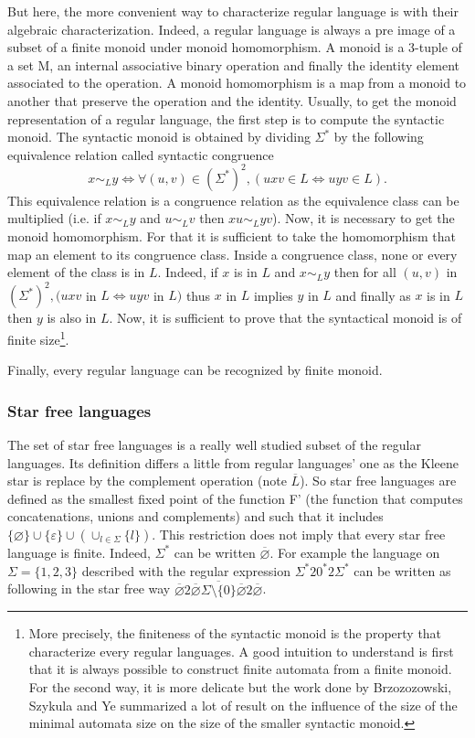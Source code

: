 But here, the more convenient way to characterize regular language is with their
algebraic characterization. Indeed, a regular language is always a pre image of a subset
of a finite monoid under monoid homomorphism. A monoid is a 3-tuple of a set M, an
internal associative binary operation and finally the identity element associated to the
operation. A monoid homomorphism is a map from a monoid to another that preserve the
operation and the identity. Usually, to get the monoid representation of a regular
language, the first step is to compute the syntactic monoid. The syntactic monoid is
obtained by dividing $\Sigma^*$ by the following equivalence relation called syntactic
congruence
\[x \sim_L y \Leftrightarrow \forall (u, v) \in \left(\Sigma^*\right)^2, (uxv \in L \Leftrightarrow uyv \in L).\]
This equivalence relation is a congruence relation as the equivalence class can be multiplied
(i.e. if $x\sim_L y$ and $u \sim_L v$ then $xu \sim_L yv$). Now, it is necessary to get the monoid
homomorphism. For that it is sufficient to take the homomorphism that map an element to its
congruence class. Inside a congruence class, none or every element of the class is in $L$.
Indeed,  if $x$ is in $L$ and $x \sim_L y$ then for all
$(u, v)$ in $\left(\Sigma^*\right)^2, (uxv$ in $L \Leftrightarrow uyv$ in $L)$ thus
$x$ in $L$ implies $y$ in $L$ and finally as $x$ is in $L$ then $y$ is also in $L$.
Now, it is sufficient to prove that the syntactical monoid is of finite size\footnote{
    More precisely, the finiteness of the syntactic monoid is the property that
    characterize every regular languages. A good intuition to understand is first that it
    is always possible to construct finite automata from a finite monoid. For the second way,
    it is more delicate but the work done by Brzozozowski, Szykula and Ye \cite[2018]{Brzozowski}
    summarized a lot of result on the influence of the size of the minimal automata size on
    the size of the smaller syntactic monoid.}.

Finally, every regular language can be recognized by finite monoid.

\subsubsection{Star free languages}\label{ssec:starfree}

The set of star free languages is a really well studied subset of the regular languages.
Its definition differs a little from regular languages' one as the Kleene star is replace
by the complement operation (note $\overline{L}$). So star free languages are defined
as the smallest fixed point of the function F' (the function that computes concatenations, unions
and complements) and such that it includes
$\{\varnothing\} \cup \{\varepsilon\} \cup(\cup_{l\in\Sigma}\{l\})$.
This restriction does not imply that every star free language is finite. Indeed,
$\Sigma^*$ can be written $\overline{\varnothing}$. For example the language on
$\Sigma = \{1, 2, 3\}$ described with the regular expression $\Sigma^*20^*2\Sigma^*$ can be written
as following in the star free way
$\overline{\varnothing}2\overline{\overline{\varnothing}\Sigma{\setminus}\{0\}\overline{\varnothing}}2\overline{\varnothing}$.

